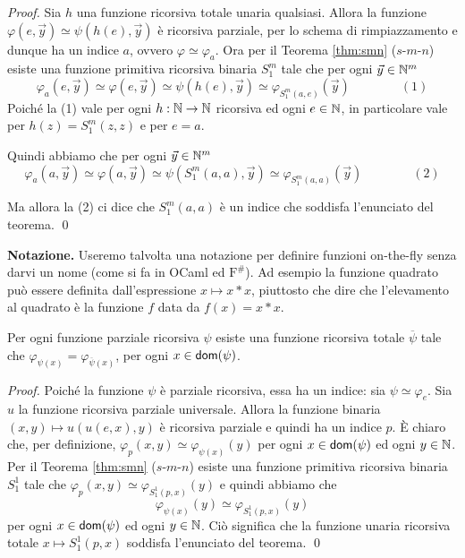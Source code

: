 \documentclass[runningheads,a4paper]{llncs}
\begin{document}
\begin{proof}
Sia $h$ una funzione ricorsiva totale unaria qualsiasi. Allora la funzione $\varphi(e,\vec y)\simeq\psi(h(e),\vec y)$ \`{e} ricorsiva parziale, per lo schema
 di rimpiazzamento e dunque ha un indice $a$, ovvero $\varphi \simeq \varphi_a$. Ora per il Teorema \ref{thm:smn} ($s$-$m$-$n$) esiste una funzione primitiva ricorsiva binaria $S_1^m$
 tale che per ogni $\vec y \in \mathbb{N}^m$
 $$\varphi_a(e,\vec y) \simeq \varphi(e,\vec y) \simeq \psi(h(e),\vec y) \simeq \varphi_{S_1^m(a,e)}(\vec y) \qquad \qquad (1) $$
 Poich\'{e} la (1) vale per ogni $h:\mathbb{N}\to \mathbb{N}$ ricorsiva ed ogni $e \in\mathbb{N}$, in particolare vale per $h(z) = S_1^m(z,z)$ e per $e = a$.
 
Quindi abbiamo che per ogni $\vec y \in \mathbb{N}^m$
$$\varphi_a(a,\vec y) \simeq \varphi(a,\vec y) \simeq \psi(S_1^m(a,a),\vec y) \simeq \varphi_{S_1^m(a,a)}(\vec y) \qquad \qquad (2)$$

Ma allora la (2) ci dice che $S_1^m(a,a)$ \`{e} un indice che soddisfa l'enunciato del teorema.
\qed\end{proof}

\textbf{Notazione.} Useremo talvolta una notazione per definire funzioni on-the-fly senza darvi un nome (come si fa in OCaml ed $\mathrm{F}^\#$).
 Ad esempio la funzione quadrato pu\`{o} essere definita dall'espressione $x \mapsto x*x$, piuttosto che dire che l'elevamento al
 quadrato \`{e} la funzione $f$ data da $f(x) = x*x$.

\begin{lemma}\label{lem:totalizzazione}
Per ogni funzione parziale ricorsiva $\psi$ esiste una funzione ricorsiva totale $\overline{\psi}$ tale che
 $\varphi_{\psi(x)} = \varphi_{\overline{\psi}(x)}$, per ogni $x \in \mathsf{dom}(\psi)$.
\end{lemma}

\begin{proof}
Poich\'{e} la funzione $\psi$ \`{e} parziale ricorsiva, essa ha un indice: sia $\psi \simeq \varphi_e$. Sia $u$ la funzione ricorsiva parziale universale.
 Allora la funzione binaria $(x,y) \mapsto u(u(e,x),y)$ \`{e} ricorsiva parziale e quindi ha un indice $p$.
 \`{E} chiaro che, per definizione, $\varphi_p(x,y) \simeq \varphi_{\psi(x)}(y)$ per ogni $x \in \mathsf{dom}(\psi)$ ed ogni $y \in \mathbb{N}$.
 Per il Teorema \ref{thm:smn} ($s$-$m$-$n$) esiste una funzione primitiva ricorsiva binaria $S_1^1$ tale che $\varphi_p(x,y) \simeq \varphi_{S_1^1(p,x)}(y)$
 e quindi abbiamo che 
$$\varphi_{\psi(x)}(y) \simeq \varphi_{S_1^1(p,x)}(y)$$
per ogni $x \in \mathsf{dom}(\psi)$ ed ogni $y \in \mathbb{N}$. Ci\`{o} significa che la funzione unaria ricorsiva totale $x \mapsto S_1^1(p,x)$
 soddisfa l'enunciato del teorema.
\qed\end{proof}
\end{document}
